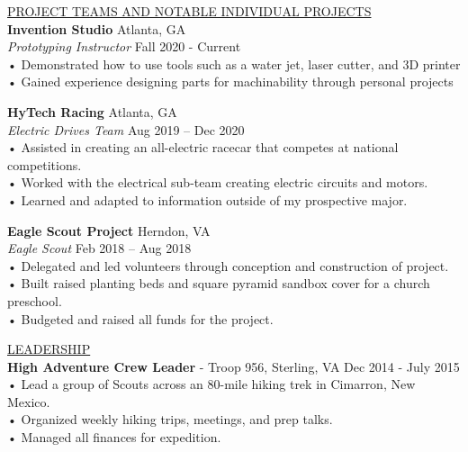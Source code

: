 \documentclass{article}
\begin{document}
\underline{\Large P\normalsize ROJECT TEAMS AND NOTABLE INDIVIDUAL PROJECTS\qquad\qquad\qquad\qquad\qquad\qquad\qquad\qquad\qquad\qquad\qquad\qquad\qquad\qquad\qquad\qquad\qquad\qquad\qquad\qquad\quad}\\                     

\large\textbf{Invention Studio} \hfill Atlanta, GA\\
\large \textit{Prototyping Instructor} \hfill Fall 2020 - Current\\
\qquad • \quad Demonstrated how to use tools such as a water jet, laser cutter, and 3D printer\\
\qquad • \quad Gained experience designing parts for machinability through personal projects
\vspace{5mm} %

\large\textbf{HyTech Racing}    \hfill Atlanta, GA\\
\large\textit{Electric Drives Team} \hfill Aug 2019 – Dec 2020\\
\qquad • \quad Assisted in creating an all-electric racecar that competes at national competitions.\\
\qquad • \quad Worked with the electrical sub-team creating electric circuits and motors.\\
\qquad • \quad Learned and adapted to information outside of my prospective major.\\
\vspace{3mm} %

\large\textbf{Eagle Scout Project}  \hfill Herndon, VA\\
\large\textit{Eagle Scout} \hfill Feb 2018 – Aug 2018\\
\qquad • \quad Delegated and led volunteers through conception and construction of project.\\
\qquad • \quad Built raised planting beds and square pyramid sandbox cover for a church preschool.\\
\qquad • \quad Budgeted and raised all funds for the project.\\
\vspace{5mm} %

\underline{\Large L\normalsize EADERSHIP\qquad\qquad\qquad\qquad\qquad\qquad\qquad\qquad\qquad\qquad\qquad\qquad\qquad\qquad\qquad\qquad\qquad\qquad\qquad\qquad\quad}\\                                                                                                                 
\large\textbf{High Adventure Crew Leader} - Troop 956, Sterling, VA     \hfill Dec 2014 - July 2015\\
\qquad • \quad Lead a group of Scouts across an 80-mile hiking trek in Cimarron, New Mexico.\\
\qquad • \quad Organized weekly hiking trips, meetings, and prep talks.\\
\qquad • \quad Managed all finances for expedition.\\
\vspace{3mm} %
\end{document}
